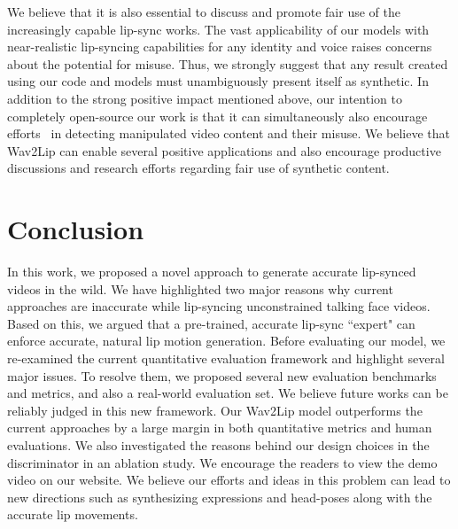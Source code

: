 \documentclass[sigconf]{acmart}
\begin{document}
We believe that it is also essential to discuss and promote fair use of the increasingly capable lip-sync works. The vast applicability of our models with near-realistic lip-syncing capabilities for any identity and voice raises concerns about the potential for misuse. Thus, we strongly suggest that any result created using our code and models must unambiguously present itself as synthetic. In addition to the strong positive impact mentioned above, our intention to completely open-source our work is that it can simultaneously also encourage efforts~\cite{Tursman_2020_CVPR_Workshops,Hsu2020DeepFI,tolosana2020deepfakes,dolhansky2020deepfake} in detecting manipulated video content and their misuse. We believe that Wav2Lip can enable several positive applications and also encourage productive discussions and research efforts regarding fair use of synthetic content.

\section{Conclusion}
\label{section:conclusion}
In this work, we proposed a novel approach to generate accurate lip-synced videos in the wild. We have highlighted two major reasons why current approaches are inaccurate while lip-syncing unconstrained talking face videos. Based on this, we argued that a pre-trained, accurate lip-sync ``expert" can enforce accurate, natural lip motion generation. Before evaluating our model, we re-examined the current quantitative evaluation framework and highlight several major issues. To resolve them, we proposed several new evaluation benchmarks and metrics, and also a real-world evaluation set. We believe future works can be reliably judged in this new framework. Our Wav2Lip model outperforms the current approaches by a large margin in both quantitative metrics and human evaluations. We also investigated the reasons behind our design choices in the discriminator in an ablation study. We encourage the readers to view the demo video on our website. We believe our efforts and ideas in this problem can lead to new directions such as synthesizing expressions and head-poses along with the accurate lip movements.

\newpage

\balance

\end{document}
